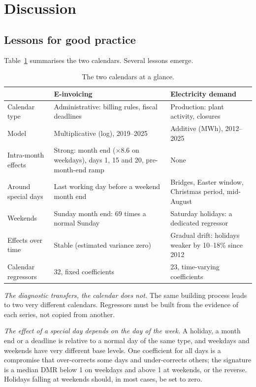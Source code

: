 \documentclass[Afour, times]{sagej}
\begin{document}
\section{Discussion}
\label{sec:discussion}

\subsection{Lessons for good practice}

Table~\ref{tab:compare} summarises the two calendars. Several lessons emerge.

\begin{table}[t]
\centering
\caption{The two calendars at a glance.}
\label{tab:compare}
\small
\begin{tabular}{@{}p{3.2cm} p{5.4cm} p{5.4cm}@{}}
\toprule
 & E-invoicing & Electricity demand \\
\midrule
Calendar type       & Administrative: billing rules, fiscal deadlines & Production: plant activity, closures \\
Model               & Multiplicative (log), 2019--2025 & Additive (MWh), 2012--2025 \\
Intra-month effects & Strong: month end ($\times$8.6 on weekdays), days 1, 15 and 20, pre-month-end ramp & None \\
Around special days & Last working day before a weekend month end & Bridges, Easter window, Christmas period, mid-August \\
Weekends            & Sunday month end: 69 times a normal Sunday & Saturday holidays: a dedicated regressor \\
Effects over time   & Stable (estimated variance zero) & Gradual drift: holidays weaker by 10--18\% since 2012 \\
Calendar regressors & 32, fixed coefficients & 23, time-varying coefficients \\
\bottomrule
\end{tabular}
\end{table}

\textit{The diagnostic transfers, the calendar does not.} The same building process leads to two very different calendars. Regressors must be built from the evidence of each series, not copied from another.

\textit{The effect of a special day depends on the day of the week.} A holiday, a month end or a deadline is relative to a normal day of the same type, and weekdays and weekends have very different base levels. One coefficient for all days is a compromise that over-corrects some days and under-corrects others; the signature is a median DMR below 1 on weekdays and above 1 at weekends, or the reverse. Holidays falling at weekends should, in most cases, be set to zero.
\end{document}
